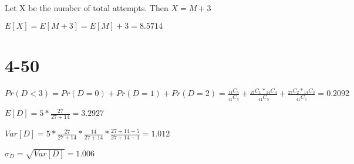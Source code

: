 \documentclass[12pt]{article}
\begin{document}
\begin{spacing}{2.0}
Let X be the number of total attempts. Then $X=M+3$

$E[X]=E[M+3]=E[M]+3= 8.5714$

\section*{4-50}

$Pr(D<3)= Pr(D=0)+ Pr(D=1)+ Pr(D=2)= \frac{{}_{14}C_{5}}{{}_{41}C_{5}} + \frac{{}_{27}C_{1}*{}_{14}C_{4}}{{}_{41}C_{5}} + \frac{{}_{27}C_{2}*{}_{14}C_{3}}{{}_{41}C_{5}}= 0.2092$

$E[D]= 5*\frac{27}{27+14}= 3.2927$

$Var[D]= 5*\frac{27}{27+14}*\frac{14}{27+14}* \frac{27+14-5}{27+14-1}= 1.012$

$\sigma_D= \sqrt{Var[D]}= 1.006$

\end{spacing}
\end{document}
